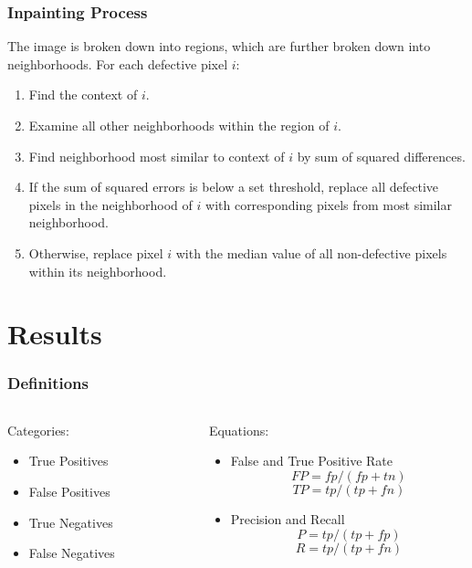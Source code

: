 \documentclass{beamer}
\begin{document}
\begin{frame}
\frametitle{Inpainting Process}
The image is broken down into regions, which are further broken down into neighborhoods. For each defective pixel $i$:
\begin{enumerate}
\item Find the context of $i$.
\item Examine all other neighborhoods within the region of $i$.
\item Find neighborhood most similar to context of $i$ by sum of squared differences.
\item If the sum of squared errors is below a set threshold, replace all defective pixels in the neighborhood of $i$ with corresponding pixels from most similar neighborhood.
\item Otherwise, replace pixel $i$ with the median value of all non-defective pixels within its neighborhood.
\end{enumerate}
\end{frame}

\section[Results]{Results}

\begin{frame}
\frametitle[Definitions]{Definitions}
\begin{columns}
\begin{column}{0.5\textwidth}
Categories:
\begin{itemize}
\item True Positives
\item False Positives
\item True Negatives
\item False Negatives
\end{itemize}
\end{column}
\begin{column}{0.5\textwidth}
Equations:
\begin{itemize}
\item False and True Positive Rate
\begin{equation*}
FP = fp / (fp + tn)
\end{equation*}
\begin{equation*}
TP = tp / (tp + fn)
\end{equation*}
\item Precision and Recall
\begin{equation*}
P = tp / (tp + fp)
\end{equation*}
\begin{equation*}
R = tp / (tp + fn)
\end{equation*}
\end{itemize}
\end{column}
\end{columns}
\end{frame}
\end{document}
